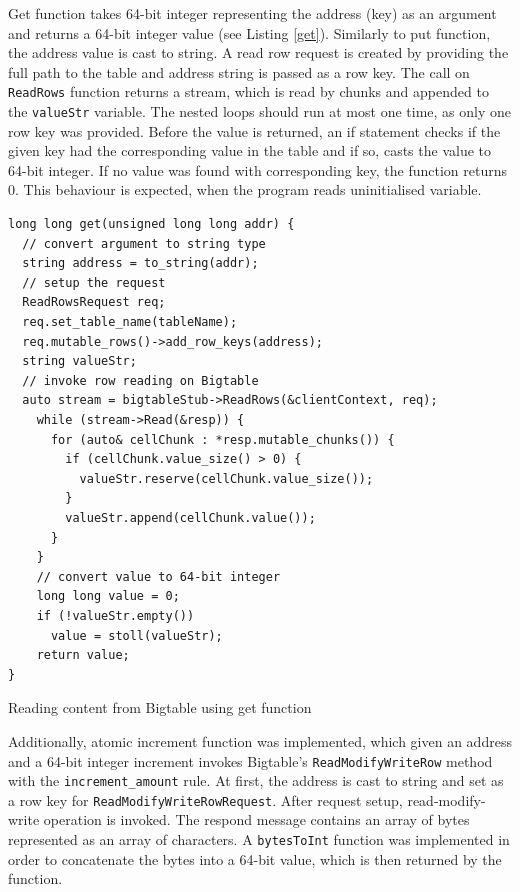 \documentclass[bsc,frontabs,twoside,singlespacing,parskip,deptreport]{infthesis}     %
\begin{document}
Get function takes 64-bit integer representing the address (key) as an argument and returns a 64-bit integer value (see Listing \ref{get}). Similarly to put function, the address value is cast to string. A read row request is created by providing the full path to the table and address string is passed as a row key. The call on \texttt{ReadRows} function returns a stream, which is read by chunks and appended to the \texttt{valueStr} variable. The nested loops should run at most one time, as only one row key was provided. Before the value is returned, an if statement checks if the given key had the corresponding value in the table and if so, casts the value to 64-bit integer. If no value was found with corresponding key, the function returns 0. This behaviour is expected, when the program reads uninitialised variable.

\begin{listing}[H]
\begin{verbatim}
long long get(unsigned long long addr) {
  // convert argument to string type
  string address = to_string(addr);
  // setup the request
  ReadRowsRequest req;
  req.set_table_name(tableName);
  req.mutable_rows()->add_row_keys(address);
  string valueStr;	
  // invoke row reading on Bigtable
  auto stream = bigtableStub->ReadRows(&clientContext, req);
    while (stream->Read(&resp)) {
      for (auto& cellChunk : *resp.mutable_chunks()) {
        if (cellChunk.value_size() > 0) {
          valueStr.reserve(cellChunk.value_size());
        }
        valueStr.append(cellChunk.value());
      }
    }
    // convert value to 64-bit integer
    long long value = 0;
    if (!valueStr.empty())
      value = stoll(valueStr);
    return value;
}
\end{verbatim}
\caption{Reading content from Bigtable using get function}
\label{get}
\end{listing}

Additionally, atomic increment function was implemented, which given an address and a 64-bit integer increment invokes Bigtable's \texttt{ReadModifyWriteRow} method with the \texttt{increment\_amount} rule. At first, the address is cast to string and set as a row key for \texttt{ReadModifyWriteRowRequest}. After request setup, read-modify-write operation is invoked. The respond message contains an array of bytes represented as an array of characters. A \texttt{bytesToInt} function was implemented in order to concatenate the bytes into a 64-bit value, which is then returned by the function.
\end{document}
